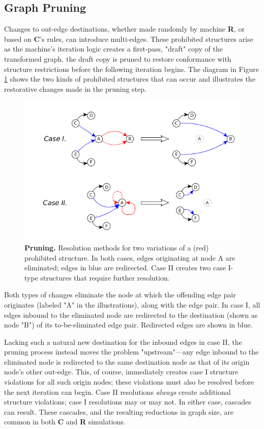 \documentclass{tufte-handout}
\begin{document}
\subsection{Graph Pruning}

Changes to out-edge destinations, whether made randomly by machine \textbf{R}, or based on \textbf{C}'s
rules, can introduce multi-edges. These prohibited structures
arise as the machine's iteration logic creates a first-pass, "draft" copy of the transformed graph.
the draft copy is pruned to restore conformance with structure restrictions before
the following iteration begins.
The diagram in Figure \ref{fig:Pruning} shows the two kinds of prohibited structures
that can occur and illustrates the restorative changes made in the pruning step.

\begin{figure}
\includegraphics{pruning.png}
\caption{\textbf{Pruning.} Resolution methods for two variations of a (red) prohibited structure.
In both cases, edges originating at node A are eliminated; edges in blue are redirected.
Case II creates two case I-type structures that require further resolution.}
\label{fig:Pruning}
\end{figure}

Both types of changes eliminate the node at which the offending edge pair
originates (labeled "A" in the illustrations), along with the edge pair.
In case I, all edges inbound to the eliminated node are redirected to 
the destination (shown as node "B") of its to-be-eliminated edge pair.
Redirected edges are shown in blue.

Lacking such a natural new destination for the inbound edges in case II, the
pruning process instead moves the problem "upstream"---any edge inbound to
the eliminated node is redirected to the same destination node as that of
its origin node's other out-edge. This, of course, immediately creates
case I structure violations for all such origin nodes; these violations must also be
resolved before the next iteration can begin.
Case II resolutions \textit{always} create additional structure violations;
case I resolutions may or may not. In either case, cascades can result. These
cascades, and the resulting reductions in graph size, are common in both
\textbf{C} and \textbf{R} simulations.
\end{document}
